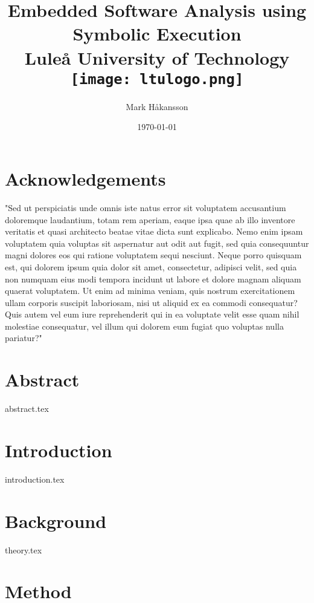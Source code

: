 \documentclass[twocolumn, a4paper]{report}
\title{
    {Embedded Software Analysis using Symbolic Execution}\\
    {\large Luleå University of Technology}\\
    {\texttt{[image: ltulogo.png]}}
}
\author{Mark Håkansson}
\date{\today}
\begin{document}
\maketitle 




\onecolumn
\chapter*{Acknowledgements}
"Sed ut perspiciatis unde omnis iste natus error sit voluptatem accusantium doloremque laudantium, totam rem aperiam, eaque ipsa quae ab illo inventore veritatis et quasi architecto beatae vitae dicta sunt explicabo. Nemo enim ipsam voluptatem quia voluptas sit aspernatur aut odit aut fugit, sed quia consequuntur magni dolores eos qui ratione voluptatem sequi nesciunt. Neque porro quisquam est, qui dolorem ipsum quia dolor sit amet, consectetur, adipisci velit, sed quia non numquam eius modi tempora incidunt ut labore et dolore magnam aliquam quaerat voluptatem. Ut enim ad minima veniam, quis nostrum exercitationem ullam corporis suscipit laboriosam, nisi ut aliquid ex ea commodi consequatur? Quis autem vel eum iure reprehenderit qui in ea voluptate velit esse quam nihil molestiae consequatur, vel illum qui dolorem eum fugiat quo voluptas nulla pariatur?"
\onecolumn
\chapter*{Abstract}
{abstract.tex}

\tableofcontents




\chapter{Introduction}
{introduction.tex}

\chapter{Background}
{theory.tex}
\chapter{Method}
\end{document}
